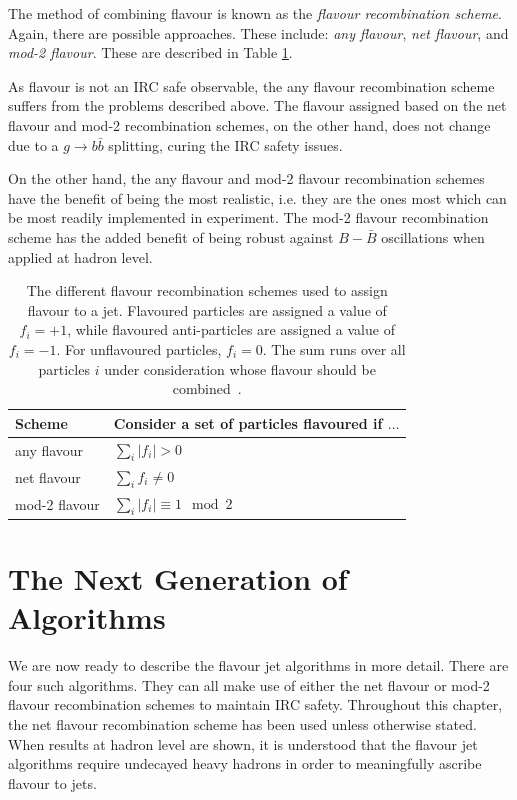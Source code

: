 \documentclass[10pt,a4paper]{book}
\begin{document}
The method of combining flavour is known as the \emph{flavour recombination scheme}. Again, there are possible approaches. These include: \emph{any flavour}, \emph{net flavour}, and \emph{mod-2 flavour}. These are described in Table \ref{tab:flavour_recombination_schemes}. 

As flavour is not an IRC safe observable, the any flavour recombination scheme suffers from the problems described above. The flavour assigned based on the net flavour and mod-2 recombination schemes, on the other hand, does not change due to a $g\rightarrow b\bar{b}$ splitting, curing the IRC safety issues.

On the other hand, the any flavour and mod-2 flavour recombination schemes have the benefit of being the most realistic, i.e. they are the ones most which can be most readily implemented in experiment. The mod-2 flavour recombination scheme has the added benefit of being robust against $B-\bar{B}$ oscillations when applied at hadron level.

\begin{table}[h]
    \centering
    \begin{tabular}{|l|l|}
    \hline
    \textbf{Scheme} & \textbf{Consider a set of particles flavoured if $\ldots$} \\ \hline
    any flavour & $\sum_i |f_i| > 0$ \\ \hline
    net flavour & $\sum_i f_i \neq 0$ \\ \hline
    mod-2 flavour & $\sum_i |f_i| \equiv 1 \mod 2$ \\ \hline
    \end{tabular}
    \caption{The different flavour recombination schemes used to assign flavour to a jet. Flavoured particles are assigned a value of $f_i = +1$, while flavoured anti-particles are assigned a value of $f_i = -1$. For unflavoured particles, $f_i = 0$. The sum runs over all particles \( i \) under consideration whose flavour should be combined~\cite{Behring:2025ilo}. }
    \label{tab:flavour_recombination_schemes}
\end{table}

\section{The Next Generation of Algorithms}

We are now ready to describe the flavour jet algorithms in more detail. There are four such algorithms. They can all make use of either the net flavour or mod-2 flavour recombination schemes to maintain IRC safety. Throughout this chapter, the net flavour recombination scheme has been used unless otherwise stated. When results at hadron level are shown, it is understood that the flavour jet algorithms require undecayed heavy hadrons in order to meaningfully ascribe flavour to jets.
\end{document}
